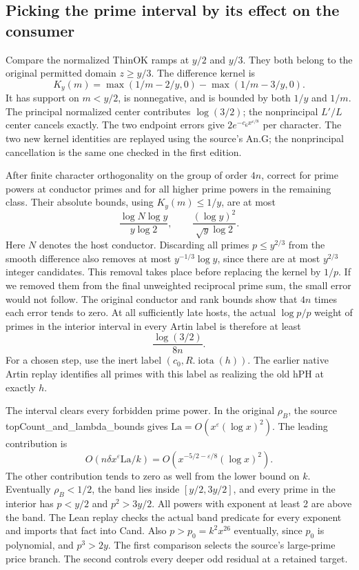 \documentclass[12pt,letterpaper]{article}
\DeclareRobustCommand{\id}[1]{\mbox{\small\ttfamily #1}}
\begin{document}
\subsection{Picking the prime interval by its effect on the consumer}

Compare the normalized \id{ThinOK} ramps at \(y/2\) and \(y/3\). They both belong to the original permitted domain \(z\ge y/3\). The difference kernel is
\[
 K_y(m)=\max(1/m-2/y,0)-\max(1/m-3/y,0).
\]
It has support on \(m<y/2\), is nonnegative, and is bounded by both \(1/y\) and \(1/m\). The principal normalized center contributes \(\log(3/2)\); the nonprincipal \(L'/L\) center cancels exactly. The two endpoint errors give \(2e^{-c_6 x^{\varepsilon/8}}\) per character. The two new kernel identities are replayed using the source's \id{An.G}; the nonprincipal cancellation is the same one checked in the first edition.

After finite character orthogonality on the group of order \(4n\), correct for prime powers at conductor primes and for all higher prime powers in the remaining class. Their absolute bounds, using \(K_y(m)\le1/y\), are at most
\[
 \frac{\log N\log y}{y\log2},\qquad
 \frac{(\log y)^2}{\sqrt{y}\log2}.
\]
Here \(N\) denotes the host conductor. Discarding all primes \(p\le y^{2/3}\) from the smooth difference also removes at most \(y^{-1/3}\log y\), since there are at most \(y^{2/3}\) integer candidates. This removal takes place before replacing the kernel by \(1/p\). If we removed them from the final unweighted reciprocal prime sum, the small error would not follow. The original conductor and rank bounds show that \(4n\) times each error tends to zero. At all sufficiently late hosts, the actual \(\log p/p\) weight of primes in the interior interval in every Artin label is therefore at least
\begin{equation}
                         \frac{\log(3/2)}{8n}.
                         \label{eq:gain-classweight}
\end{equation}
For a chosen step, use the inert label \((c_0,R.\operatorname{iota}(h))\). The earlier native Artin replay identifies all primes with this label as realizing the old \id{hPH} at exactly \(h\).

The interval clears every forbidden prime power. In the original \(\rho_B\), the source \id{topCount\_and\_lambda\_bounds} gives \(\mathrm{La}=O(x^\varepsilon(\log x)^2)\). The leading contribution is
\[
 O(n\delta x^\varepsilon\mathrm{La}/k)
       = O(x^{-5/2-\varepsilon/8}(\log x)^2).
\]
The other contribution tends to zero as well from the lower bound on \(k\). Eventually \(\rho_B<1/2\), the band lies inside \([y/2,3y/2]\), and every prime in the interior has \(p<y/2\) and \(p^2>3y/2\). All powers with exponent at least 2 are above the band. The Lean replay checks the actual band predicate for every exponent and imports that fact into \id{Cand}. Also \(p>p_0=k^2x^{26}\) eventually, since \(p_0\) is polynomial, and \(p^3>2y\). The first comparison selects the source's large-prime price branch. The second controls every deeper odd residual at a retained target.
\end{document}
